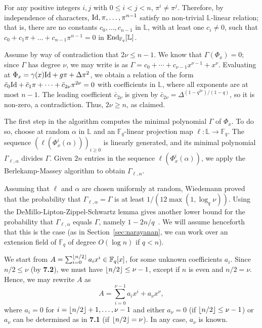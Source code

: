 \documentclass[sigconf]{acmart}
\newcommand{\F}{\mathbb{F}}
\renewcommand{\L}{\mathbb{L}}
\DeclarePairedDelimiter\floor{\lfloor}{\rfloor}
\begin{document}
For any positive integers $i,j$ with $0 \le i < j < n$, $\pi^i \ne
\pi^j$. Therefore, by independence of characters, ${\rm Id}, \pi,
\ldots, \pi^{n-1}$ satisfy no non-trivial $\L$-linear relation;
that is, there are no constants $c_0, \ldots, c_{n-1}$ in $\L$,
with at least one $c_i \neq 0$, such that $c_0 + c_1 \pi + \ldots +
c_{n-1}\pi^{n-1}=0$ in ${\rm End}_{\F_q}[\L]$.

Assume by way of contradiction that $2\nu \le n-1$.  We know that
$\Gamma(\Phi_x) = 0$; since $\Gamma$ has degree $\nu$, we may write
is as $\Gamma = c_0 + \cdots + c_{\nu-1} x^{\nu-1} +
x^\nu$. Evaluating at $\Phi_x = \gamma(x) {\rm Id} + g \pi + \Delta
\pi^2$, we obtain a relation of the form $\bar c_0 {\rm Id} + \bar
c_1 \pi + \cdots + \bar c_{2\nu} \pi^{2\nu} = 0$ with
coefficients in $\L$, where all exponents are at most $n-1$. The
leading coefficient $\bar c_{2\nu}$ is given by $\bar c_{2\nu} =
\Delta^{(1-q^{2\nu})/(1-q)}$, so it is non-zero, a contradiction.
Thus, $2\nu \ge n$, as claimed.

\smallskip{} The first step in the algorithm computes
the minimal polynomial $\Gamma$ of $\Phi_x$. 
To do so, choose at random $\alpha$ in $\L$ and an $\F_q$-linear
projection map  $\ell: \L \to \F_q$. The sequence
$(\ell(\Phi_x^i(\alpha)))_{i \ge 0}$ is linearly generated, and its
minimal polynomial $\Gamma_{\ell,\alpha}$ divides $\Gamma$. Given $2n$
entries in the sequence $\ell(\Phi_x^i(\alpha))$, we apply the
Berlekamp-Massey algorithm to obtain $\Gamma_{\ell,\alpha}$.

Assuming that $\ell$ and $\alpha$ are chosen uniformly at random,
Wiedemann proved~\cite{Wiedemann:1986:SSL:13738.13744} that the
probability that $\Gamma_{\ell,\alpha}=\Gamma$ is at least $1/(12
\max(1, \log_q \nu))$. Using the DeMillo-Lipton-Zippel-Schwartz lemma
gives another lower bound for the probability that
$\Gamma_{\ell,\alpha}$ equals $\Gamma$, namely
$1-2n/q$~\cite{Kaltofen:1991:PEP:113379.113396,Kaltofen-saun:1991:WMS:646027.676885}. We
will assume henceforth that this is the case
(as in Section~\ref{sec:narayanan}, we can work over an extension 
field of $\F_q$ of degree $O(\log n)$ if $q < n$).

\smallskip{}
We start from $A = \sum_{i = 0}^{\floor*{n/2}}a_ix^i \in \F_q[x]$, for
some unknown coefficients $a_i$. Since $n/2 \le \nu$ (by {\bf 7.2}), we must have 
$\floor*{n/2} \le \nu -1$, except if $n$ is even and $n/2 = \nu$.
Hence, we may rewrite $A$ as 
$$A = \sum_{i = 0}^{\nu - 1}a_ix^i + a_{\nu}x^{\nu},$$ where $a_i = 0$
for $i=\floor*{n/2}+1,\dots,\nu-1$ and either $a_\nu=0$ (if
$\floor*{n/2} \le \nu -1$) or $a_\nu$ can be determined as in {\bf
  7.1} (if $\floor*{n/2} = \nu$). In any case, $a_\nu$ is known.
\end{document}
